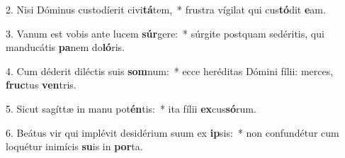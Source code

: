 2. Nisi Dóminus custodíerit civi\textbf{tá}tem,~*  frustra vígilat qui cus\textbf{tó}dit \textbf{e}am.\

3. Vanum est vobis ante lucem \textbf{súr}gere:~*  súrgite postquam sedéritis, qui manducátis \textbf{pa}nem do\textbf{ló}ris.\

4. Cum déderit diléctis suis \textbf{som}num:~*  ecce heréditas Dómini fílii: merces, \textbf{fruc}tus \textbf{ven}tris.\

5. Sicut sagíttæ in manu pot\textbf{én}tis:~*  ita fílii \textbf{ex}cus\textbf{só}rum.\

6. Beátus vir qui implévit desidérium suum ex \textbf{ip}sis:~*  non confundétur cum loquétur inimícis \textbf{su}is in \textbf{por}ta.\

